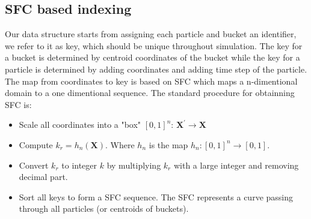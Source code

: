 \documentclass[procedia]{easychair}
\begin{document}
\subsection{SFC based indexing}
Our data structure starts from assigning each particle and bucket an identifier, we refer to it as key, which should be unique throughout simulation. The key for a bucket is determined by centroid coordinates of the bucket while the key for a particle is determined by adding coordinates and adding time step of the particle. The map from coordinates to key is based on SFC \cite{sagan2012space} which maps a n-dimentional domain to a one dimentional sequence. The standard procedure for obtainning SFC is: 
\begin{itemize}
\item Scale all coordinates into a "box" $[0,1]^n $: $\textbf{X}^\prime \rightarrow \textbf{X}$
\item Compute $k_r = h_n(\textbf{X})$. Where $h_n$ is the map $h_n: [0,1]^n \rightarrow [0,1]$. 
\item Convert $k_r$ to integer $k$ by multiplying $k_r$ with a large integer and removing decimal part.
\item Sort all keys to form a SFC sequence. The SFC represents a curve passing through all particles (or centroids of buckets).
\end{itemize}
%
\end{document}
